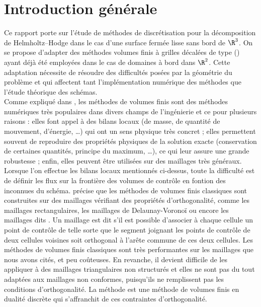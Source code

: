 \chapter*{Introduction générale}

Ce rapport porte sur l’étude de méthodes de discrétisation pour la décomposition de Helmholtz--Hodge dans le cas d’une surface fermée lisse sans bord de $\R^3$. On se propose d’adapter des méthodes volumes finis à grilles décalées de type  (\ddfv) ayant déjà été employées dans le cas de domaines à bord dans $\R^2$. Cette adaptation nécessite de résoudre des difficultés posées par la géométrie du problème et qui affectent tant l’implémentation numérique des méthodes que l’étude théorique des schémas. \\

Comme expliqué dans \cite{omnes_developpement_2010}, les méthodes de volumes finis sont des méthodes numériques très populaires dans divers champs de l'ingénierie et ce pour plusieurs raisons : elles font appel à des bilans locaux (de masse, de quantité de mouvement, d'énergie, \dots) qui ont un sens physique très concret ; elles permettent souvent de reproduire des propriétés physiques de la solution exacte (conservation de certaines quantités, principe du maximum, \dots), ce qui leur assure une grande robustesse ; enfin, elles peuvent être utilisées sur des maillages très généraux. Lorsque l'on effectue les bilans locaux mentionnés ci-dessus, toute la difficulté est de définir les flux sur la frontière des volumes de contrôle en fontion des inconnues du schéma. \cite{delcourte_developpement_2007} précise que les méthodes de volumes finis classiques sont construites sur des maillages vérifiant des propriétés d'orthogonalité, comme les maillages rectangulaires, les maillages de Delaunay-Voronoï ou encore les maillages dits . Un maillage est dit  s'il est possible d'associer à chaque cellule un point de contrôle de telle sorte que le segment joignant les points de contrôle de deux cellules voisines soit orthogonal à l'arête commune de ces deux cellules. Les méthodes de volumes finis classiques sont très performantes sur les maillages que nous avons cités, et peu coûteuses. En revanche, il devient difficile de les appliquer à des maillages triangulaires non structurés et elles ne sont pas du tout adaptées aux maillages non conformes, puisqu'ils ne remplissent pas les conditions d'orthogonalité. La méthode \ddfv est une méthode de volumes finis en dualité discrète qui s'affranchit de ces contraintes d'orthogonalité. \\

